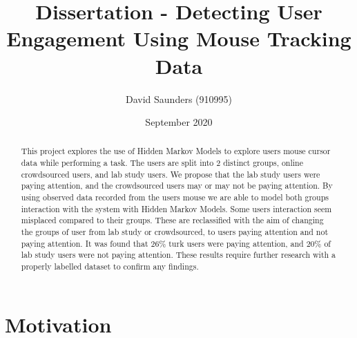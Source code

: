 \documentclass{article}
\title{Dissertation - Detecting User Engagement Using Mouse Tracking Data}
\author{David Saunders (910995)}
\date{September 2020}
\begin{document}
\maketitle

\begin{abstract} 
    This project explores the use of Hidden Markov Models to explore users mouse cursor data while performing a task.
    The users are split into 2 distinct groups, online crowdsourced users, and lab study users.
    We propose that the lab study users were paying attention, and the crowdsourced users may or may not be paying attention.
    By using observed data recorded from the users mouse we are able to model both groups interaction with the system with Hidden Markov Models.
    Some users interaction seem misplaced compared to their groups.
    These are reclassified with the aim of changing the groups of user from lab study or crowdsourced, to users paying attention and not paying attention.     
    It was found that 26\% turk users were paying attention, and 20\% of lab study users were not paying attention.
    These results require further research with a properly labelled dataset to confirm any findings.

\end{abstract}

\tableofcontents



\section{Motivation}





\end{document}
